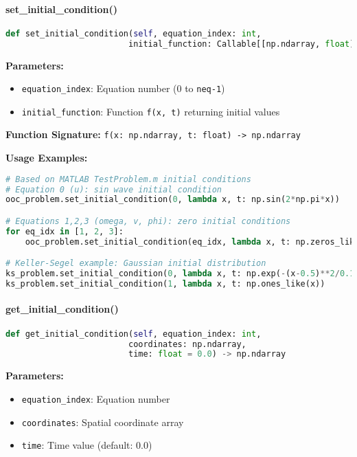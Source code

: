\paragraph{set\_initial\_condition()}
\begin{lstlisting}[language=Python, caption=Set Initial Condition Method]
def set_initial_condition(self, equation_index: int, 
                         initial_function: Callable[[np.ndarray, float], np.ndarray])
\end{lstlisting}

\textbf{Parameters:}
\begin{itemize}
    \item \texttt{equation\_index}: Equation number (0 to \texttt{neq-1})
    \item \texttt{initial\_function}: Function \texttt{f(x, t)} returning initial values
\end{itemize}

\textbf{Function Signature:} \texttt{f(x: np.ndarray, t: float) -> np.ndarray}

\textbf{Usage Examples:}
\begin{lstlisting}[language=Python, caption=Initial Condition Examples]
# Based on MATLAB TestProblem.m initial conditions
# Equation 0 (u): sin wave initial condition
ooc_problem.set_initial_condition(0, lambda x, t: np.sin(2*np.pi*x))

# Equations 1,2,3 (omega, v, phi): zero initial conditions
for eq_idx in [1, 2, 3]:
    ooc_problem.set_initial_condition(eq_idx, lambda x, t: np.zeros_like(x))

# Keller-Segel example: Gaussian initial distribution
ks_problem.set_initial_condition(0, lambda x, t: np.exp(-(x-0.5)**2/0.1))
ks_problem.set_initial_condition(1, lambda x, t: np.ones_like(x))
\end{lstlisting}

\paragraph{get\_initial\_condition()}
\begin{lstlisting}[language=Python, caption=Get Initial Condition Method]
def get_initial_condition(self, equation_index: int, 
                         coordinates: np.ndarray, 
                         time: float = 0.0) -> np.ndarray
\end{lstlisting}

\textbf{Parameters:}
\begin{itemize}
    \item \texttt{equation\_index}: Equation number
    \item \texttt{coordinates}: Spatial coordinate array
    \item \texttt{time}: Time value (default: 0.0)
\end{itemize}

